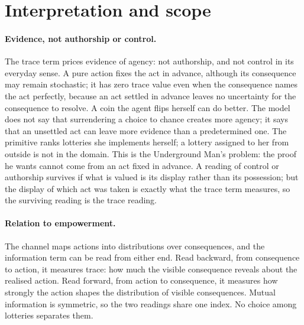 \documentclass[11pt,a4paper]{article}
\theoremstyle{definition}
\newcommand{\1}{\mathbf 1}
\begin{document}
\section{Interpretation and scope}\label{sec:interpretation}

\paragraph{Evidence, not authorship or control.}
The trace term prices evidence of agency: not authorship, and not control in its everyday sense.  A pure action
fixes the act in advance, although its consequence may remain stochastic; it has
zero trace value even when the consequence names the act perfectly, because an act settled in advance leaves no
uncertainty for the consequence to resolve.  A coin the agent flips herself can do better.  The model does not
say that surrendering a choice to chance creates more agency; it says that an unsettled act can leave more
evidence than a predetermined one.  The primitive ranks lotteries she implements herself; a lottery assigned to her
from outside is not in the domain.  This is the Underground Man's problem: the proof he wants cannot come from an act
fixed in advance.  A reading of control or authorship survives if what is valued is its display rather than its
possession; but the display of which act was taken is exactly what the trace term measures, so the surviving reading
is the trace reading.

\paragraph{Relation to empowerment.}
The channel maps actions into distributions over consequences, and the information term can be read from either
end.  Read backward, from consequence to action, it measures trace: how much the visible consequence reveals
about the realised action.  Read forward, from action to consequence, it measures how strongly the action
shapes the distribution of visible consequences.  Mutual information is symmetric, so the two readings share
one index.  No choice among lotteries separates them.
\end{document}
